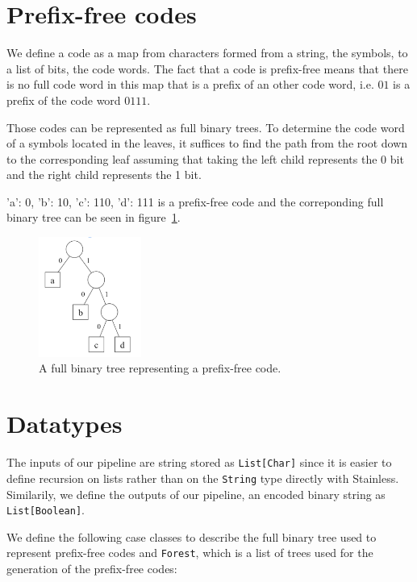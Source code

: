 \documentclass[a4paper,UKenglish,cleveref, autoref, thm-restate]{lipics-v2021}
\begin{document}
\section{Prefix-free codes}

We define a code as a map from characters formed from a string, the symbols, to a list of bits, the code words. The fact that a code is prefix-free means that there is no full code word in this map that is a prefix of an other code word, i.e. $01$ is a prefix of the code word $0111$.

Those codes can be represented as full binary trees. To determine the code word of a symbols located in the leaves, it suffices to find the path from the root down to the corresponding leaf assuming that taking the left child represents the 0 bit and the right child represents the 1 bit.

{'a': 0, 'b': 10, 'c': 110, 'd': 111} is a prefix-free code and the correponding full binary tree can be seen in figure~\ref{fig:pfc}.
\begin{figure}[ht]
    \centering
    \includegraphics[width=0.3\textwidth]{pfc.png}
    \caption{A full binary tree representing a prefix-free code.\label{fig:pfc}}
\end{figure}

\pagebreak

\section{Datatypes}

The inputs of our pipeline are string stored as \lstinline{List[Char]} since it is easier to define recursion on lists rather than on the \lstinline{String} type directly with Stainless. 
Similarily, we define the outputs of our pipeline, an encoded binary string as \lstinline{List[Boolean]}.

We define the following case classes to describe the full binary tree used to represent prefix-free codes and \lstinline{Forest}, which is a list of trees used for the generation of the prefix-free codes:
\end{document}
